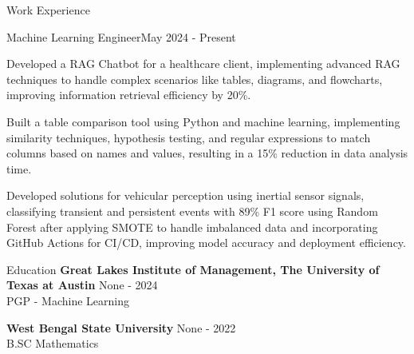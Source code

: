 \documentclass{resume} %
\begin{document}
    \begin{rSection}{Work Experience}
                    \begin{rSubsection}
                {Machine Learning Engineer}{May 2024 - Present}
                                    {}
                                {}
                                    \item Developed a RAG Chatbot for a healthcare client, implementing advanced RAG techniques to handle complex scenarios like tables, diagrams, and flowcharts, improving information retrieval efficiency by 20\%.
                                    \item Built a table comparison tool using Python and machine learning, implementing similarity techniques, hypothesis testing, and regular expressions to match columns based on names and values, resulting in a 15\% reduction in data analysis time.
                                    \item Developed solutions for vehicular perception using inertial sensor signals, classifying transient and persistent events with 89\% F1 score using Random Forest after applying SMOTE to handle imbalanced data and incorporating GitHub Actions for CI/CD, improving model accuracy and deployment efficiency.
                            \end{rSubsection}
            \end{rSection}

\begin{rSection}{Education}
                        \textbf{Great Lakes Institute of Management, The University of Texas at Austin} \hfill {None - 2024} \\
                            {PGP {-} Machine Learning}
                         
             
         
                        \textbf{West Bengal State University} \hfill {None - 2022} \\
                            {B.SC Mathematics}
                         
             
         
    \end{rSection}
\end{document}

